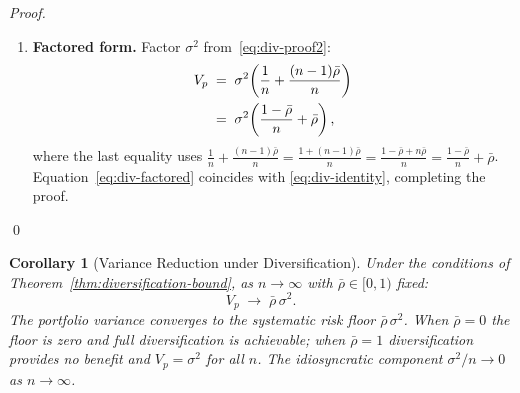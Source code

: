 \documentclass[12pt,openany]{book}
\numberwithin{equation}{chapter}
\theoremstyle{plain}
\newtheorem{corollary}[theorem]{Corollary}
\theoremstyle{definition}
\theoremstyle{remark}
\begin{document}
\begin{proof}
\begin{enumerate}
  \item \textbf{Factored form.}
        Factor $\sigma^2$ from~\eqref{eq:div-proof2}:
        \begin{align}
          V_p
          &\;=\; \sigma^2\!\left(
                   \frac{1}{n}
                   + \frac{(n-1)\bar{\rho}}{n}
                 \right)
          \notag\\
          &\;=\; \sigma^2\!\left(
                   \frac{1 - \bar{\rho}}{n}
                   + \bar{\rho}
                 \right),
          \label{eq:div-factored}
        \end{align}
        where the last equality uses
        $\frac{1}{n} + \frac{(n-1)\bar{\rho}}{n}
         = \frac{1 + (n-1)\bar{\rho}}{n}
         = \frac{1 - \bar{\rho} + n\bar{\rho}}{n}
         = \frac{1-\bar{\rho}}{n} + \bar{\rho}$.
        Equation~\eqref{eq:div-factored} coincides with
        \eqref{eq:div-identity}, completing the proof.
\end{enumerate}
\qed
\end{proof}

\begin{corollary}[Variance Reduction under Diversification]
\label{cor:var-reduction}
Under the conditions of Theorem~\ref{thm:diversification-bound},
as $n \to \infty$ with $\bar{\rho} \in [0,1)$ fixed:
\begin{equation}
  V_p \;\longrightarrow\; \bar{\rho}\,\sigma^2.
  \label{eq:systematic-floor}
\end{equation}
The portfolio variance converges to the \emph{systematic risk floor}
$\bar{\rho}\,\sigma^2$.  When $\bar{\rho} = 0$ the floor is zero and
full diversification is achievable; when $\bar{\rho} = 1$
diversification provides no benefit and $V_p = \sigma^2$ for all $n$.
The idiosyncratic component $\sigma^2/n \to 0$ as $n \to \infty$.
\end{corollary}
\end{document}
